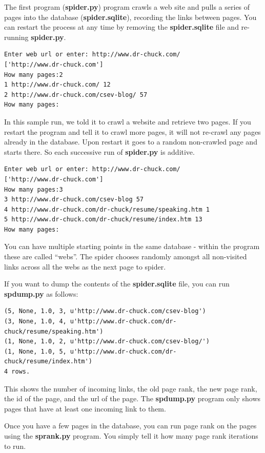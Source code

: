 \documentclass[11pt]{book}
\begin{document}
The first program ({\bf spider.py}) program crawls a web 
site and pulls a series of pages into the
database ({\bf spider.sqlite}), recording the links between pages.
You can restart the process at any time by removing the 
{\bf spider.sqlite} file and re-running {\bf spider.py}.

\beforeverb
\begin{verbatim}
Enter web url or enter: http://www.dr-chuck.com/
['http://www.dr-chuck.com']
How many pages:2
1 http://www.dr-chuck.com/ 12
2 http://www.dr-chuck.com/csev-blog/ 57
How many pages:
\end{verbatim}
\afterverb
%
In this sample run, we told it to crawl a website and retrieve two 
pages.  If you restart the program and tell it to crawl more
pages, it will not re-crawl any pages already in the database.  Upon 
restart it goes to a random non-crawled page and starts there.  So 
each successive run of {\bf spider.py} is additive.

\beforeverb
\begin{verbatim}
Enter web url or enter: http://www.dr-chuck.com/
['http://www.dr-chuck.com']
How many pages:3
3 http://www.dr-chuck.com/csev-blog 57
4 http://www.dr-chuck.com/dr-chuck/resume/speaking.htm 1
5 http://www.dr-chuck.com/dr-chuck/resume/index.htm 13
How many pages:
\end{verbatim}
\afterverb
%
You can have multiple starting points in the same database - 
within the program these are called ``webs''.   The spider
chooses randomly amongst all non-visited links across all
the webs as the next page to spider.

If you want to dump the contents of the {\bf spider.sqlite} file, you can 
run {\bf spdump.py} as follows:

\beforeverb
\begin{verbatim}
(5, None, 1.0, 3, u'http://www.dr-chuck.com/csev-blog')
(3, None, 1.0, 4, u'http://www.dr-chuck.com/dr-chuck/resume/speaking.htm')
(1, None, 1.0, 2, u'http://www.dr-chuck.com/csev-blog/')
(1, None, 1.0, 5, u'http://www.dr-chuck.com/dr-chuck/resume/index.htm')
4 rows.
\end{verbatim}
\afterverb
%
This shows the number of incoming links, the old page rank, the new page
rank, the id of the page, and the url of the page.  The {\bf spdump.py} program
only shows pages that have at least one incoming link to them.

Once you have a few pages in the database, you can run page rank on the
pages using the {\bf sprank.py} program.  You simply tell it how many page
rank iterations to run.
\end{document}
